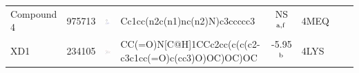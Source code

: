 \documentclass[aps,pre,twocolumn,nofootinbib,superscriptaddress,10pt, final,tightenlines]{revtex4-1}
\begin{document}
\begin{table}
\begin{center}
\begin{tabular}{llp{2cm}>{\ttfamily}lS[table-format=-1.2, table-figures-uncertainty=1]ll}
Compound 4                   & 975713                                 & \parbox[c]{1em}{\includegraphics[scale=0.15]{figures/new-bromo/975713.pdf}}   & Cc1cc(n2c(n1)nc(n2)N)c3ccccc3                                    & NS$^{\rm a,f}$                                    & 4MEQ~\cite{Vidler:2013:J.Med.Chem.}        & ~\cite{Vidler:2013:J.Med.Chem.}         \\ 
XD1                          & 234105                                 & \parbox[c]{1em}{\includegraphics[scale=0.15]{figures/new-bromo/234105.pdf}}   & CC(=O)N[C@H]1CCc2cc(c(c(c2-c3c1cc(=O)c(cc3)O)OC)OC)OC            & -5.95$^{\rm b}$                                      & 4LYS~~\cite{Lucas:2013:Angew.Chem.Int.Ed.} & ~\cite{Lucas:2013:Angew.Chem.Int.Ed.}   \\ 

\end{tabular}
\end{center}
\end{table}
\end{document}
